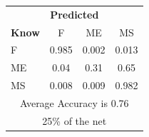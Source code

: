 \documentclass[12pt]{article} %
\begin{document}
\begin{minipage}{0.5\textwidth}
\begin{center}
\begin{tabular}{l|c|c|c|}
 \multicolumn{4}{c}{ \textbf{ Predicted}}\\
 \textbf{Know}&F&ME&MS\\ \hline\hline
F   &0.985&0.002&0.013\\
ME &0.04&0.31&0.65\\
MS &0.008&0.009&0.982\\
\multicolumn{4}{c}{Average Accuracy is 0.76}\\
\multicolumn{4}{c}{25\%  of the net}\\
\end{tabular}
\end{center}
\end{minipage}
\end{document}

